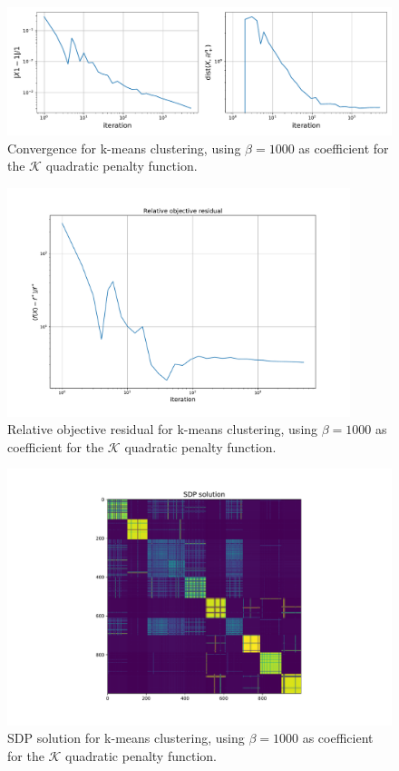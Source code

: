 \documentclass[12pt]{article}
\begin{document}
\begin{figure}[H]
    \centering
    \includegraphics[width=17cm]{hw4/code/part3/results/beta/convergence.pdf}
    \caption{Convergence for k-means clustering, using $\beta = 1000$ as coefficient for the $\mathcal{K}$ quadratic penalty function.}
    \label{fig:beta-convergence}
\end{figure}
\begin{figure}[H]
    \centering
    \includegraphics[width=10cm]{hw4/code/part3/results/beta/relative_objective_residual.pdf}
    \caption{Relative objective residual for k-means clustering, using $\beta = 1000$ as coefficient for the $\mathcal{K}$ quadratic penalty function.}
    \label{fig:beta-relative-obj-res}
\end{figure}
\begin{figure}[H]
    \centering
    \includegraphics[width=12cm]{hw4/code/part3/results/beta/heatmap.pdf}
    \caption{SDP solution for k-means clustering, using $\beta = 1000$ as coefficient for the $\mathcal{K}$ quadratic penalty function.}
    \label{fig:beta-heatmap}
\end{figure}
\end{document}
